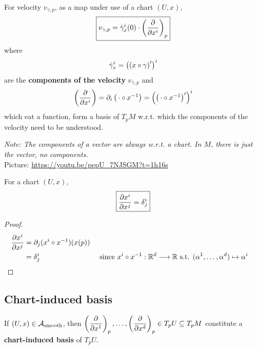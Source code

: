 \begin{definition}
For velocity $v_{\gamma,p}$, as a map under use of a chart $(U,x)$,
\begin{equation}\label{eq:defVelocityExpansion}
\boxed{v_{\gamma,p} = \dot{\gamma}_x^i(0) \cdot \left(\cibasis{x^i}\right)_p}
\end{equation} 
where
\begin{equation}\label{eq:defVelocityComponents}
\displaystyle\dot{\gamma}_x^i = \left(\left(x \after \gamma\right)^\prime\right)^i
\end{equation} 
are the \textbf{components of the velocity} $v_{\gamma,p}$ and
\begin{equation}\label{eq:defCIBasis}
\displaystyle\left(\cibasis{x^i}\right) = \partial_i\left(\,\cdot \after x^{-1}\right) = \left(\left(\, \cdot \after x^{-1}\right)^\prime\right)^i
\end{equation} 
which eat a function, form a basis of $T_pM$ w.r.t. which the components of the velocity need to be understood.
\end{definition}

\textit{Note: The components of a vector are always w.r.t. a chart. In $M$, there is just the vector, no components.} \\
Picture: \url{https://youtu.be/pepU_7NJSGM?t=1h16s}

\begin{theorem}
\label{thm:L5_dxiupondxj}
For a chart $(U,x)$,
\begin{equation}
\boxed{\cibasis[x^i]{x^j} = \delta^i_j}
\end{equation}
\end{theorem}
\begin{proof}
\begin{align*}
\cibasis[x^i]{x^j} & = \partial_j (x^i \after x^{-1})(x(p)) \\
& = \delta^i_j && \text{ since } x^i \after x^{-1} : \R^d \to \R \text{ s.t. } (\alpha^1 , \dots , \alpha^d) \mapsto \alpha^i
\end{align*}
\end{proof}

\subsection{Chart-induced basis}
\begin{definition}
If $(U,x) \in \A_{\text{smooth}}$, then $\displaystyle\left(\cibasis{x^1}\right)_p, \dotsc, \left(\cibasis{x^d}\right)_p \in T_pU \subseteq T_pM$ constitute a \textbf{chart-induced basis} of $T_pU$.
\end{definition}

